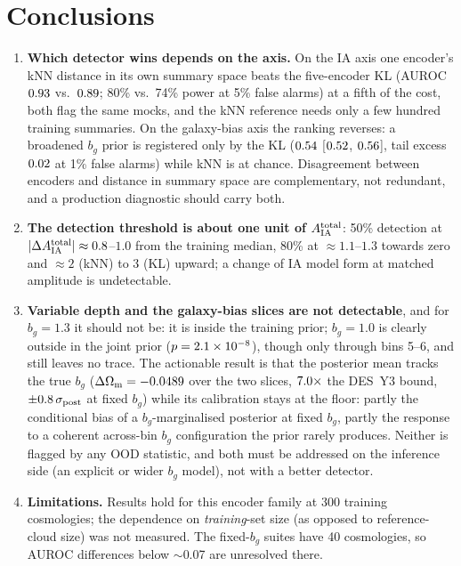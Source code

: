 \documentclass[9pt,twocolumn]{extarticle}
\newcommand{\Aia}{A_{\rm IA}^{\rm total}}
\newcommand{\dAia}{|\Delta A_{\rm IA}^{\rm total}|}
\newcommand{\Om}{\Omega_{\rm m}}
\newcommand{\bg}{b_g}
\begin{document}
\section{Conclusions}
\begin{enumerate}\setlength{\itemsep}{1pt}
\item \textbf{Which detector wins depends on the axis.} On the IA axis one encoder's kNN distance in
its own summary space beats the five-encoder KL (AUROC $0.93$ vs.\ $0.89$; 80\% vs.\
74\% power at 5\% false alarms) at a fifth of the cost, both flag the same mocks, and the kNN reference
needs only a few hundred training summaries. On the galaxy-bias axis the ranking reverses: a broadened
$\bg$ prior is registered only by the KL ($0.54$ [$0.52$, $0.56$],
tail excess $0.02$ at 1\% false alarms) while kNN is at chance. Disagreement between
encoders and distance in summary space are complementary, not redundant, and a production diagnostic
should carry both.
\item \textbf{The detection threshold is about one unit of $\Aia$}: 50\% detection at
$\dAia\approx0.8$--$1.0$ from the training median, 80\% at $\approx1.1$--$1.3$ towards zero and
$\approx2$ (kNN) to $3$ (KL) upward; a change of IA model form at matched amplitude is undetectable.
\item \textbf{Variable depth and the galaxy-bias slices are not detectable}, and for $\bg=1.3$ it
should not be: it is inside the training prior; $\bg=1.0$ is clearly outside in the joint prior
($p=2.1\times10^{-8}$), though only through bins 5--6, and still leaves no trace. The
actionable result is that the posterior mean tracks the true $\bg$ ($\Delta\Om=\NDthetaOmegaM$ over the
two slices, $7.0\times$ the DES~Y3 bound, $\pm0.8\,\sigma_{\rm post}$ at fixed $\bg$)
while its calibration stays at the floor: partly the conditional bias of a $\bg$-marginalised
posterior at fixed $\bg$, partly the response to a coherent across-bin $\bg$ configuration the prior
rarely produces. Neither is flagged by any OOD statistic, and both must be addressed on the inference
side (an explicit or wider $\bg$ model), not with a better detector.
\item \textbf{Limitations.} Results hold for this encoder family at 300 training cosmologies; the
dependence on \emph{training}-set size (as opposed to reference-cloud size) was not measured. The fixed-$\bg$
suites have 40 cosmologies, so AUROC differences below $\sim$0.07 are unresolved there.
\end{enumerate}
\end{document}
